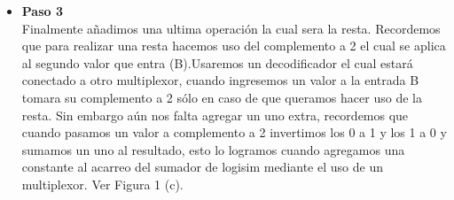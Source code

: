 \documentclass[10pt,letterpaper]{article}
\begin{document}
\begin{enumerate}
\begin{itemize}
				\item \textbf{Paso 3}\\
				\hspace*{0.5cm} Finalmente añadimos una ultima operación la cual sera la resta. Recordemos que para realizar una resta hacemos uso del complemento a 2 el cual se aplica al segundo valor que entra (B).Usaremos un decodificador el cual estará conectado a otro multiplexor, cuando ingresemos un valor a la entrada B tomara su complemento a 2 sólo en caso de que queramos hacer uso de la resta. Sin embargo aún nos falta agregar un uno extra, recordemos que cuando pasamos un valor a complemento a 2 invertimos los 0 a 1 y los 1 a 0 y sumamos un uno al resultado, esto lo logramos cuando agregamos una constante al acarreo del sumador de logisim mediante el uso de un multiplexor.
				Ver Figura 1 (c).
				
			\end{itemize}
				

\end{enumerate}
\end{document}

